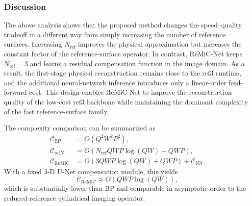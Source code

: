 \documentclass[journal]{IEEEtran}
\begin{document}
\subsubsection{Discussion}

The above analysis shows that the proposed method changes the speed--quality tradeoff in a different way from simply increasing the number of reference surfaces. Increasing $N_{\mathrm{ref}}$ improves the physical approximation but increases the constant factor of the reference-surface operator. In contrast, ReMiC-Net keeps $N_{\mathrm{ref}}=3$ and learns a residual compensation function in the image domain. As a result, the first-stage physical reconstruction remains close to the ref3 runtime, and the additional neural-network inference introduces only a linear-order feed-forward cost. This design enables ReMiC-Net to improve the reconstruction quality of the low-cost ref3 backbone while maintaining the dominant complexity of the fast reference-surface family.

The complexity comparison can be summarized as
\begin{equation}
\begin{aligned}
    \mathcal{C}_{\mathrm{BP}}
    &= O\left(Q^2W^2P^2\right), \\
    \mathcal{C}_{\mathrm{ref}N}
    &= O\left(N_{\mathrm{ref}}QWP\log(QW)+QWP\right), \\
    \mathcal{C}_{\mathrm{ReMiC}}
    &= O\left(3QWP\log(QW)+QWP\right)+\mathcal{C}_{\mathrm{NN}}.
\end{aligned}
\end{equation}
With a fixed 3-D U-Net compensation module, this yields
\begin{equation}
    \mathcal{C}_{\mathrm{ReMiC}}
    \approx O\left(QWP\log(QW)\right),
\end{equation}
which is substantially lower than BP and comparable in asymptotic order to the reduced-reference cylindrical imaging operator.


\end{document}
